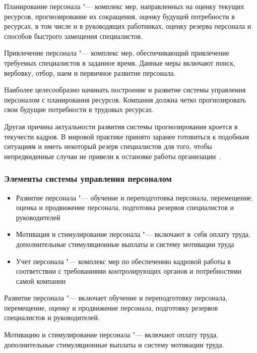 \documentclass{../industrial-development}
\begin{document}
\lecturenotes

\alert{Планирование персонала} "--- комплекс мер, направленных на оценку текущих ресурсов, прогнозирование их сокращения, оценку будущей потребности в ресурсах, в том числе и в руководящих работниках, оценку резерва персонала и способов быстрого замещения специалистов.

\alert{Привлечение персонала} "--- комплекс мер, обеспечивающий привлечение требуемых специалистов в заданное время. Данные меры включают поиск, вербовку, отбор, наем и первичное развитие персонала.

Наиболее целесообразно начинать построение и развитие системы управления персоналом с планирования ресурсов. Компания должна четко прогнозировать свои будущие потребности в трудовых ресурсах. 

Другая причина актуальности развития системы прогнозирования кроется в текучести кадров. В мировой практике принято заранее готовиться к подобным ситуациям и иметь некоторый резерв специалистов для того, чтобы непредвиденные случаи не привели к остановке работы организации~\cite[с.~52]{Nelarin}.

\begin{frame} \frametitle{Элементы системы управления персоналом}
	\begin{itemize}
		\item \alert{Развитие персонала} "--- обучение и переподготовка персонала, перемещение, оценка и продвижение персонала, подготовка резервов специалистов и руководителей 	 
		
		\item	\alert{Мотивация и стимулирование персонала} "--- включают в~себя оплату труда, дополнительные стимуляционные выплаты и систему мотивации труда
		
		\item	\alert{Учет персонала} "--- комплекс мер по обеспечению кадровой работы в соответствии с требованиями контролирующих органов и потребностями самой компании
		
	\end{itemize}
\end{frame}

\lecturenotes

\alert{Развитие персонала} "--- включает обучение и переподготовку персонала, перемещение, оценку и продвижение персонала, подготовку резервов специалистов и руководителей.

\alert{Мотивацию и стимулирование персонала} "--- включают оплату труда, дополнительные стимуляционные выплаты и систему мотивации труда.
\end{document}
